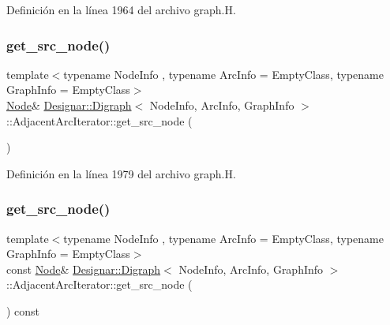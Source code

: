 Definición en la línea 1964 del archivo graph.\+H.

\mbox{\label{class_designar_1_1_digraph_1_1_adjacent_arc_iterator_a72e125198f4cea2ab0ac1213c1cbc1e4}} 
\subsubsection{\texorpdfstring{get\+\_\+src\+\_\+node()}{get\_src\_node()}\hspace{0.1cm}{\footnotesize\ttfamily [1/2]}}
{\footnotesize\ttfamily template$<$typename Node\+Info , typename Arc\+Info  = Empty\+Class, typename Graph\+Info  = Empty\+Class$>$ \\
\hyperlink{class_designar_1_1_digraph_a4dc921c41a480b7946a04170e997d8ae}{Node}\& \hyperlink{class_designar_1_1_digraph}{Designar\+::\+Digraph}$<$ Node\+Info, Arc\+Info, Graph\+Info $>$\+::Adjacent\+Arc\+Iterator\+::get\+\_\+src\+\_\+node (\begin{DoxyParamCaption}{ }\end{DoxyParamCaption})\hspace{0.3cm}{\ttfamily [inline]}}



Definición en la línea 1979 del archivo graph.\+H.

\mbox{\label{class_designar_1_1_digraph_1_1_adjacent_arc_iterator_a09c51f5124610cd6e5360dc7039b4639}} 
\subsubsection{\texorpdfstring{get\+\_\+src\+\_\+node()}{get\_src\_node()}\hspace{0.1cm}{\footnotesize\ttfamily [2/2]}}
{\footnotesize\ttfamily template$<$typename Node\+Info , typename Arc\+Info  = Empty\+Class, typename Graph\+Info  = Empty\+Class$>$ \\
const \hyperlink{class_designar_1_1_digraph_a4dc921c41a480b7946a04170e997d8ae}{Node}\& \hyperlink{class_designar_1_1_digraph}{Designar\+::\+Digraph}$<$ Node\+Info, Arc\+Info, Graph\+Info $>$\+::Adjacent\+Arc\+Iterator\+::get\+\_\+src\+\_\+node (\begin{DoxyParamCaption}{ }\end{DoxyParamCaption}) const\hspace{0.3cm}{\ttfamily [inline]}}




